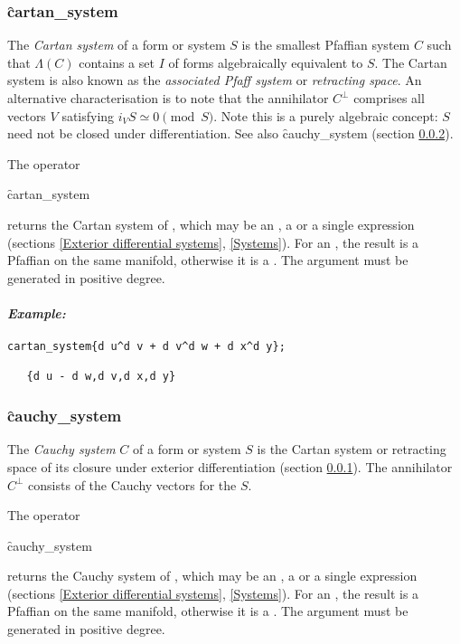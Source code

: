 \subsubsection{\f{cartan\_system}}
\label{cartan_system}

The \emph{Cartan system} of a form or system $S$ is the smallest Pfaffian
system $C$ such that $\Lambda(C)$ contains a set $I$ of forms algebraically
equivalent to $S$. The Cartan system is also known as the \emph{associated
Pfaff system} or \emph{retracting space}. An alternative characterisation is
to note that the annihilator $C^\perp$ comprises all vectors $V$ satisfying
$i_V S \simeq 0 \pmod{S}$.  Note this is a purely algebraic concept: $S$
need not be closed under differentiation. See also \f{cauchy\_system}
(section \ref{cauchy_system}).

\hypertarget{operator:CARTAN_SYSTEM}{}
The operator
\begin{syntax}
	\f{cartan\_system} 
\end{syntax}
returns the Cartan system of , which may be an , a
 or a single  expression (sections \ref{Exterior
differential systems}, \ref{Systems}). For an , the result is a
Pfaffian  on the same manifold, otherwise it is a
. The argument must be generated in positive degree.

\paragraph{\textit{Example:}}
\begin{verbatim}
cartan_system{d u^d v + d v^d w + d x^d y};

   {d u - d w,d v,d x,d y}
\end{verbatim}

\subsubsection{\f{cauchy\_system}}
\label{cauchy_system}

The \emph{Cauchy system} $C$ of a form or system $S$ is the Cartan system or
retracting space of its closure under exterior differentiation (section
\ref{cartan_system}). The annihilator $C^\perp$ consists of the Cauchy
vectors for the $S$.

\hypertarget{operator:CAUCHY_SYSTEM}{}
The operator
\begin{syntax}
	\f{cauchy\_system} 
\end{syntax}
returns the Cauchy system of , which may be an , a
 or a single  expression (sections \ref{Exterior
differential systems}, \ref{Systems}). For an , the result is a
Pfaffian  on the same manifold, otherwise it is a
. The argument must be generated in positive degree.

